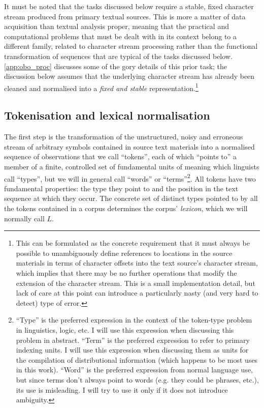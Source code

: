 It must be noted that the tasks discussed below require a stable, fixed character stream produced from primary textual sources.
This is more a matter of data acquisition than textual analysis proper, meaning that the practical and computational problems that must be dealt with in its context belong to a different family, related to character stream processing rather than the functional transformation of sequences that are typical of the tasks discussed below.
\autoref{app:obo_proc} discusses some of the gory details of this prior task; the discussion below assumes that the underlying character stream has already been cleaned and normalised into a \emph{fixed and stable} representation.\footnote{
    \label{foot:charoffsets}
    This can be formulated as the concrete requirement that it must always be possible to unambiguously define references to locations in the source materials in terms of character offsets into the text source's character stream, which implies that there may be no further operations that modify the extension of the character stream.
    This is a small implementation detail, but lack of care at this point can introduce a particularly nasty (and very hard to detect) type of error.
}

\subsection{Tokenisation and lexical normalisation}
\label{subsec:tokens}

The first step is the transformation of the unstructured, noisy and erroneous stream of arbitrary symbols contained in source text materials into a normalised sequence of observations that we call ``tokens'', each of which ``points to'' a member of a finite, controlled set of fundamental units of meaning which linguists call ``types'', but we will in general call ``words'' or ``terms''\footnote{
    \label{foot:tokentype}
    ``Type'' is the preferred expression in the context of the token-type problem in linguistics, logic, etc.
    I will use this expression when discussing this problem in abstract.
    ``Term'' is the preferred expression to refer to primary indexing units.
    I will use this expression when discussing them as units for the compilation of distributional information (which happens to be most uses in this work).
    ``Word'' is the preferred expression from normal language use, but since terms don't always point to words (e.g. they could be phrases, etc.), its use is misleading.
    I will try to use it only if it does not introduce ambiguity.
}.
All tokens have two fundamental properties: the type they point to and the position in the text sequence at which they occur.
The concrete set of distinct types pointed to by all the tokens contained in a corpus determines the corpus' \emph{lexicon}, which we will normally call $L$.

